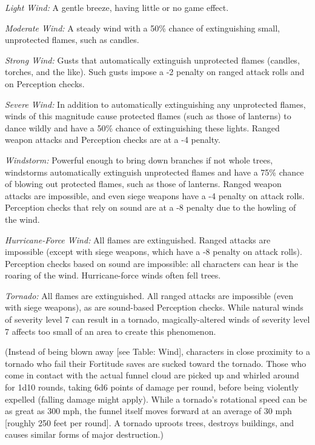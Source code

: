 {	\par \textit{Light Wind:} A gentle breeze, having little or no game effect.
	\par \textit{Moderate Wind:} A steady wind with a 50\% chance of extinguishing small, unprotected flames, such as candles.
	\par \textit{Strong Wind:} Gusts that automatically extinguish unprotected flames (candles, torches, and the like). Such gusts impose a -2 penalty on ranged attack rolls and on Perception checks.
	\par \textit{Severe Wind:} In addition to automatically extinguishing any unprotected flames, winds of this magnitude cause protected flames (such as those of lanterns) to dance wildly and have a 50\% chance of extinguishing these lights. Ranged weapon attacks and Perception checks are at a -4 penalty.
	\par \textit{Windstorm:} Powerful enough to bring down branches if not whole trees, windstorms automatically extinguish unprotected flames and have a 75\% chance of blowing out protected flames, such as those of lanterns. Ranged weapon attacks are impossible, and even siege weapons have a -4 penalty on attack rolls. Perception checks that rely on sound are at a -8 penalty due to the howling of the wind.
	\par \textit{Hurricane-Force Wind:} All flames are extinguished. Ranged attacks are impossible (except with siege weapons, which have a -8 penalty on attack rolls). Perception checks based on sound are impossible: all characters can hear is the roaring of the wind. Hurricane-force winds often fell trees.
	\par \textit{Tornado:} All flames are extinguished. All ranged attacks are impossible (even with siege weapons), as are sound-based Perception checks. While natural winds of severity level 7 can result in a tornado, magically-altered winds of severity level 7 affects too small of an area to create this phenomenon. 
	\par (Instead of being blown away [see Table: Wind], characters in close proximity to a tornado who fail their Fortitude saves are sucked toward the tornado. Those who come in contact with the actual funnel cloud are picked up and whirled around for 1d10 rounds, taking 6d6 points of damage per round, before being violently expelled (falling damage might apply). While a tornado's rotational speed can be as great as 300 mph, the funnel itself moves forward at an average of 30 mph [roughly 250 feet per round]. A tornado uproots trees, destroys buildings, and causes similar forms of major destruction.)
}
